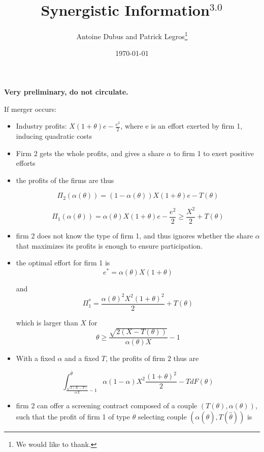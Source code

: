 \documentclass[a4paper]{article}
\renewcommand{\th}{\hat\theta}
\renewcommand{\t}{\theta}
\renewcommand{\a}{\alpha}
\begin{document}
\title{Synergistic Information$^{3.0}$}
\author{Antoine Dubus and Patrick Legros\thanks{We would like to thank.}}
\date{\today}


\maketitle

 
\textbf{Very preliminary, do not circulate.}

\baselineskip0.7cm

If merger occurs:

\begin{itemize}
    \item Industry profits: $X(1+\t)e-\frac{e^2}{2}$, where e is an effort exerted by firm 1, inducing quadratic costs
    \item Firm 2 gets the whole profits, and gives a share $\a$ to firm 1 to exert positive efforts
    \item the profits of the firms are thus
    
    $$\Pi_2(\a(\t))= (1-\a(\t))X(1+\t)e-T(\t)$$

    $$\Pi_1(\a(\t))= \a(\t) X(1+\t)e-\frac{e^2}{2}\geq \frac{X^2}{2}+T(\t)$$
    
    \item firm 2 does not know the type of firm 1, and thus ignores whether the share $\a$ that maximizes its profits is enough to ensure participation.
    
    \item the optimal effort for firm 1 is $$e^*=\a(\t) X(1+\t)$$ 
    
    and $$\Pi_1^*=\frac{\a(\t)^2 X^2(1+\t)^2}{2}+T(\t)$$
    
    which is larger than $X$ for $$\t\geq \frac{\sqrt{2 (X-T(\t))}}{\a(\t) X}-1$$
    
    \item With a fixed $\a$ and a fixed $T$, the profits of firm 2 thus are
    
    $$\int_{\frac{\sqrt{2 (X-T)}}{\a X}-1}^{\overline \t}\a(1-\a)X^2\frac{(1+\t)^2}{2}-T dF(\t)$$
    
    \item firm 2 can offer a screening contract composed of a couple $(T(\t),\a(\t))$, such that the profit of firm 1 of type $\t$ selecting couple $(\a(\th), T(\th))$ is
    

\end{itemize}
\end{document}
